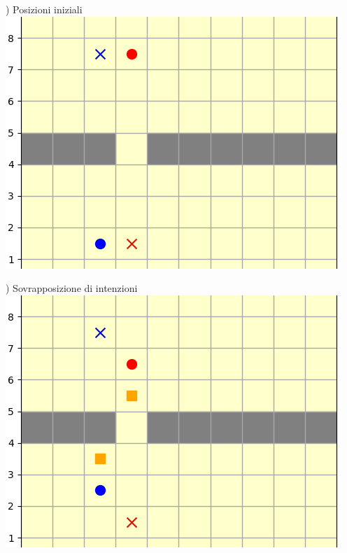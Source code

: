 \documentclass[12pt]{article}
\begin{document}
\begin{minipage}[ht]{0.45\linewidth}
) Posizioni iniziali
\includegraphics[width=\textwidth]{SimulazioniNavigazione/2AGV_ConflittoWait/0t.png}
\end{minipage}
\begin{minipage}[ht]{0.45\linewidth}
) Sovrapposizione di intenzioni
\includegraphics[width=\textwidth]{SimulazioniNavigazione/2AGV_ConflittoWait/1t.png}
\end{minipage}\\

\vspace{1cm}
\end{document}

